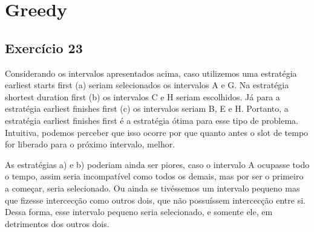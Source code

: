 \section{Greedy}\label{sec:greedy}

\subsection{Exercício 23}\label{sec:exer23}


Considerando os intervalos apresentados acima, caso utilizemos uma estratégia
earliest starts first (a) seriam selecionados os intervalos A e G. Na estratégia
shortest duration first (b) os intervalos C e H seriam escolhidos. Já para a 
estratégia earliest finishes first (c) os intervalos seriam B, E e H. Portanto,
a estratégia earliest finishes first é a estratégia ótima para esse tipo de problema.
Intuitiva, podemos perceber que isso ocorre por que quanto antes o slot de tempo
for liberado para o próximo intervalo, melhor.

As estratégias a) e b) poderiam 
ainda ser piores, caso o intervalo A ocupasse todo o tempo, assim seria incompatível
como todos os demais, mas por ser o primeiro a começar, seria selecionado. Ou ainda
se tivéssemos um intervalo pequeno mas que fizesse intercecção como outros dois, que
não possuíssem intercecção entre si. Dessa forma, esse intervalo pequeno seria
selecionado, e somente ele, em detrimentos dos outros dois.

